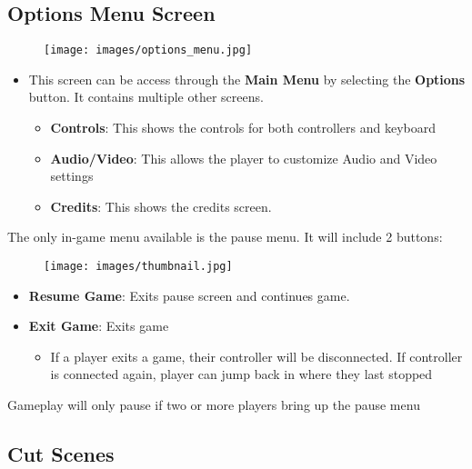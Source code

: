 \documentclass[10pt]{report}
\begin{document}
\subsection{Options Menu Screen}

\begin{figure}[H]
    \centering
    \texttt{[image: images/options\_menu.jpg]}
\end{figure}

\begin{itemize}
    \item This screen can be access through the \textbf{Main Menu} by selecting the \textbf{Options} button. It contains multiple other screens.
    \begin{itemize}
        \item \textbf{Controls}: This shows the controls for both controllers and keyboard
        \item \textbf{Audio/Video}: This allows the player to customize Audio and Video settings
        \item \textbf{Credits}: This shows the credits screen.    
    \end{itemize}
\end{itemize}


The only in-game menu available is the pause menu. It will include 2 buttons:

\begin{figure}
    \centering
    \texttt{[image: images/thumbnail.jpg]}
    \caption{}
\end{figure}

\begin{itemize}
    \item \textbf{Resume Game}: Exits pause screen and continues game.
    \item \textbf{Exit Game}: Exits game
    \begin{itemize}
        \item If a player exits a game, their controller will be disconnected. If controller is connected again, player can jump back in where they last stopped 
    \end{itemize}
\end{itemize}

Gameplay will only pause if two or more players bring up the pause menu

\subsection{Cut Scenes}
\end{document}
